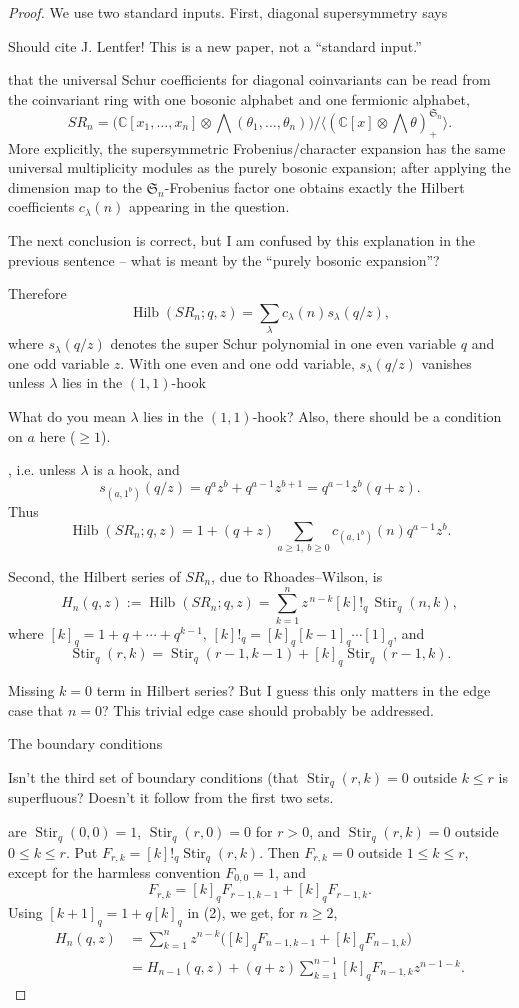 \documentclass[12pt]{article}
\newcommand{\Hilb}{\operatorname{Hilb}}
\newcommand{\Stir}{\operatorname{Stir}}
\newcommand{\review}[1]{\begin{reviewbox}#1\end{reviewbox}}
\begin{document}
\begin{proof}
We use two standard inputs.  First, diagonal supersymmetry says \review{Should cite J. Lentfer!  This is a new paper, not a ``standard input.''} that the
universal Schur coefficients for diagonal coinvariants can be read from the
coinvariant ring with one bosonic alphabet and one fermionic alphabet,
\[
 SR_n=\bigl(\mathbb C[x_1,\ldots,x_n]\otimes
          \bigwedge(\theta_1,\ldots,\theta_n)\bigr)
/\langle(\mathbb C[x]\otimes\bigwedge\theta)^{\mathfrak S_n}_{+}\rangle .
\]
More explicitly, the supersymmetric Frobenius/character expansion has the same
universal multiplicity modules as the purely bosonic expansion; after applying
the dimension map to the \(\mathfrak S_n\)-Frobenius factor  one obtains exactly
the Hilbert coefficients \(c_\lambda(n)\) appearing in the question. \review{The next conclusion is correct, but I am confused by this explanation in the previous sentence -- what is meant by the ``purely bosonic expansion''?} Therefore
\[
        \Hilb(SR_n;q,z)=\sum_\lambda c_\lambda(n)s_\lambda(q/z),
\]
where \(s_\lambda(q/z)\) denotes the super Schur polynomial in one even variable
\(q\) and one odd variable \(z\).   With one even and one odd variable,
\(s_\lambda(q/z)\) vanishes unless \(\lambda\) lies in the \((1,1)\)-hook \review{What do you mean $\lambda$ lies in the $(1, 1)$-hook? Also, there should be a condition on $a$ here ($\geq 1$).}, i.e.
unless \(\lambda\) is a hook, and
\[
        s_{(a,1^b)}(q/z)=q^a z^b+q^{a-1}z^{b+1}
        =q^{a-1}z^b(q+z).
\]
Thus
\[
        \Hilb(SR_n;q,z)
        =1+(q+z)\sum_{a\ge1,\ b\ge0}
              c_{(a,1^b)}(n)q^{a-1}z^b .          \tag{1}
\]

Second, the Hilbert series of \(SR_n\), due to Rhoades--Wilson, is
\[
        H_n(q,z):=\Hilb(SR_n;q,z)
        =\sum_{k=1}^{n} z^{\,n-k}[k]!_q\,\Stir_q(n,k),                 \tag{2}
\]
where \([k]_q=1+q+\cdots+q^{k-1}\), \([k]!_q=[k]_q[k-1]_q\cdots[1]_q\), and
\[
        \Stir_q(r,k)=\Stir_q(r-1,k-1)+[k]_q\Stir_q(r-1,k).
\] \review{Missing $k = 0$ term in Hilbert series? But I guess this only matters in the edge case that $n = 0$? This trivial edge case should probably be addressed.}
The boundary conditions \review{Isn't the third set of boundary conditions (that $\Stir_q(r, k) = 0$ outside $ k \leq r$ is superfluous? Doesn't it follow from the first two sets.} are
\(\Stir_q(0,0)=1\), \(\Stir_q(r,0)=0\) for \(r>0\), and
\(\Stir_q(r,k)=0\) outside \(0\le k\le r\).  Put
\(F_{r,k}=[k]!_q\Stir_q(r,k)\).  Then \(F_{r,k}=0\) outside
\(1\le k\le r\), except for the harmless convention \(F_{0,0}=1\), and
\[
        F_{r,k}=[k]_qF_{r-1,k-1}+[k]_qF_{r-1,k}.
\]
Using \([k+1]_q=1+q[k]_q\) in (2), we get, for \(n\ge2\),
\[
\begin{aligned}
H_n(q,z)
&=\sum_{k=1}^{n}z^{n-k}\bigl([k]_qF_{n-1,k-1}
                         +[k]_qF_{n-1,k}\bigr)\\
&=H_{n-1}(q,z)
 +(q+z)\sum_{k=1}^{n-1}[k]_qF_{n-1,k}z^{n-1-k}.
\end{aligned}
\]


\end{proof}
\end{document}

